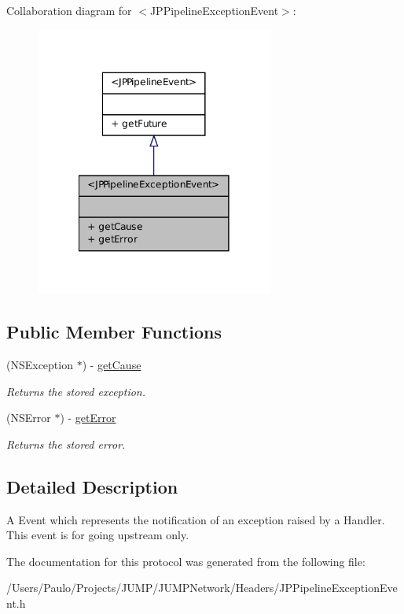 Collaboration diagram for $<$JPPipelineExceptionEvent$>$:\nopagebreak
\begin{figure}[H]
\begin{center}
\leavevmode
\includegraphics[width=222pt]{a00137}
\end{center}
\end{figure}
\subsection*{Public Member Functions}
\begin{DoxyCompactItemize}
\item 
\hypertarget{a00027_a98011afe1a6950c5aff925647fbd440a}{
(NSException $\ast$) -\/ \hyperlink{a00027_a98011afe1a6950c5aff925647fbd440a}{getCause}}
\label{a00027_a98011afe1a6950c5aff925647fbd440a}

\begin{DoxyCompactList}\small\item\em Returns the stored exception. \item\end{DoxyCompactList}\item 
\hypertarget{a00027_ae4f8fbaa0141878985c20bd477d777c8}{
(NSError $\ast$) -\/ \hyperlink{a00027_ae4f8fbaa0141878985c20bd477d777c8}{getError}}
\label{a00027_ae4f8fbaa0141878985c20bd477d777c8}

\begin{DoxyCompactList}\small\item\em Returns the stored error. \item\end{DoxyCompactList}\end{DoxyCompactItemize}


\subsection{Detailed Description}
A Event which represents the notification of an exception raised by a Handler. This event is for going upstream only. 

The documentation for this protocol was generated from the following file:\begin{DoxyCompactItemize}
\item 
/Users/Paulo/Projects/JUMP/JUMPNetwork/Headers/JPPipelineExceptionEvent.h\end{DoxyCompactItemize}
